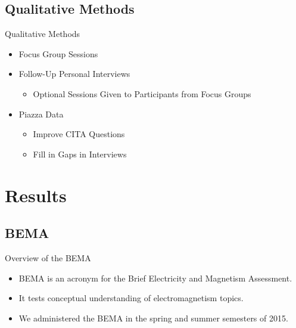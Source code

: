 \documentclass{beamer}
\begin{document}
\subsection*{Qualitative Methods}

\begin{frame}{Qualitative Methods}
\begin{itemize}
\item Focus Group Sessions
\item Follow-Up Personal Interviews
\begin{itemize}
\item Optional Sessions Given to Participants from Focus Groups
\end{itemize}
\item Piazza Data
\begin{itemize}
\item Improve CITA Questions
\item Fill in Gaps in Interviews
\end{itemize}
\end{itemize}
\end{frame}

\section{Results}

\subsection*{BEMA}

\begin{frame}{Overview of the BEMA}
\begin{itemize}
\item BEMA is an acronym for the Brief Electricity and Magnetism Assessment.
\item It tests conceptual understanding of electromagnetism topics.
\item We administered the BEMA in the spring and summer semesters of 2015.
\end{itemize}
\end{frame}
\end{document}
